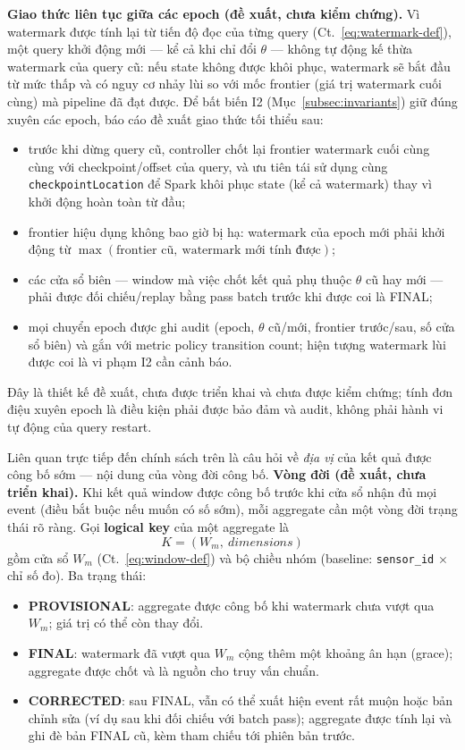 \textbf{Giao thức liên tục giữa các epoch (đề xuất, chưa kiểm chứng).} Vì
watermark được tính lại từ tiến độ đọc của từng query
(Ct.~\ref{eq:watermark-def}), một query khởi động mới --- kể cả khi chỉ đổi
$\theta$ --- không tự động kế thừa watermark của query cũ: nếu state không
được khôi phục, watermark sẽ bắt đầu từ mức thấp và có nguy cơ nhảy lùi so
với mốc frontier (giá trị watermark cuối cùng) mà pipeline đã đạt được. Để
bất biến I2 (Mục~\ref{subsec:invariants}) giữ đúng xuyên các epoch, báo cáo
đề xuất giao thức tối thiểu sau:
\begin{itemize}
  \item trước khi dừng query cũ, controller chốt lại frontier watermark cuối
        cùng cùng với checkpoint/offset của query, và ưu tiên tái sử dụng cùng
        \texttt{checkpointLocation} để Spark khôi phục state (kể cả watermark)
        thay vì khởi động hoàn toàn từ đầu;
  \item frontier hiệu dụng không bao giờ bị hạ: watermark của epoch mới phải
        khởi động từ $\max(\text{frontier cũ},\ \text{watermark mới tính
        được})$;
  \item các cửa sổ biên --- window mà việc chốt kết quả phụ thuộc $\theta$ cũ
        hay mới --- phải được đối chiếu/replay bằng pass batch trước khi được
        coi là FINAL;
  \item mọi chuyển epoch được ghi audit (epoch, $\theta$ cũ/mới, frontier
        trước/sau, số cửa sổ biên) và gắn với metric policy transition count;
        hiện tượng watermark lùi được coi là vi phạm I2 cần cảnh báo.
\end{itemize}
Đây là thiết kế đề xuất, chưa được triển khai và chưa được kiểm chứng; tính
đơn điệu xuyên epoch là điều kiện phải được bảo đảm và audit, không phải hành
vi tự động của query restart.

Liên quan trực tiếp đến chính sách trên là câu hỏi về \emph{địa vị} của kết
quả được công bố sớm --- nội dung của vòng đời công bố.
\textbf{Vòng đời (đề xuất, chưa triển khai).} Khi kết quả window được công bố
trước khi
cửa sổ nhận đủ mọi event (điều bắt buộc nếu muốn có số sớm), mỗi aggregate cần
một vòng đời trạng thái rõ ràng. Gọi \textbf{logical key} của một aggregate là
\begin{equation}
  K = (W_m,\ \mathit{dimensions})
  \label{eq:logical-key}
\end{equation}
gồm cửa sổ $W_m$ (Ct.~\ref{eq:window-def}) và bộ chiều nhóm (baseline:
\texttt{sensor\_id} $\times$ chỉ số đo). Ba trạng thái:

\begin{itemize}
  \item \textbf{PROVISIONAL}: aggregate được công bố khi watermark chưa vượt
        qua $W_m$; giá trị có thể còn thay đổi.
  \item \textbf{FINAL}: watermark đã vượt qua $W_m$ cộng thêm một khoảng ân
        hạn (grace); aggregate được chốt và là nguồn cho truy vấn chuẩn.
  \item \textbf{CORRECTED}: sau FINAL, vẫn có thể xuất hiện event rất muộn
        hoặc bản chỉnh sửa (ví dụ sau khi đối chiếu với batch pass); aggregate
        được tính lại và ghi đè bản FINAL cũ, kèm tham chiếu tới phiên bản
        trước.
\end{itemize}

